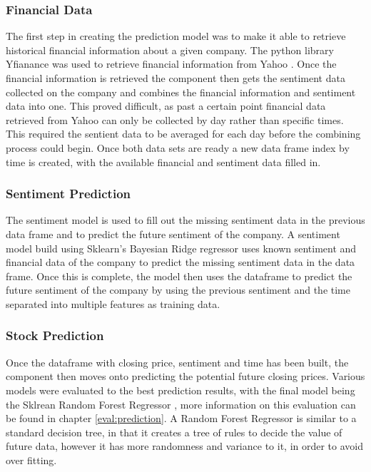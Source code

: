             \subsubsection{Financial Data} The first step in creating the prediction model was to make it able to retrieve historical financial information about a given company. The python library Yfianance \citep{technology:yfinance} was used to retrieve financial information from Yahoo \citep{website:Yahoo}. Once the financial information is retrieved the component then gets the sentiment data collected on the company and combines the financial information and sentiment data into one. This proved difficult, as past a certain point financial data retrieved from Yahoo can only be collected by day rather than specific times. This required the sentient data to be averaged for each day before the combining process could begin. Once both data sets are ready a new data frame index by time is created, with the available financial and sentiment data filled in. 
            
            \subsubsection{Sentiment Prediction} The sentiment model is used to fill out the missing sentiment data in the previous data frame and to predict the future sentiment of the company. A sentiment model build using Sklearn's Bayesian Ridge regressor \cite{sklearn_bayes} uses known sentiment and financial data of the company to predict the missing sentiment data in the data frame. Once this is complete, the model then uses the dataframe to predict the future sentiment of the company by using the previous sentiment and the time separated into multiple features as training data. 
            
            \subsubsection{Stock Prediction} Once the dataframe with closing price, sentiment and time has been built, the component then moves onto predicting the potential future closing prices. Various models were evaluated to the best prediction results, with the final model being the Sklrean Random Forest Regressor \cite{sklearn_forest}, more information on this evaluation can be found in chapter \ref{eval:prediction}. A Random Forest Regressor is similar to a standard decision tree, in that it creates a tree of rules to decide the value of future data, however it has more randomness and variance to it, in order to avoid over fitting. 
            
